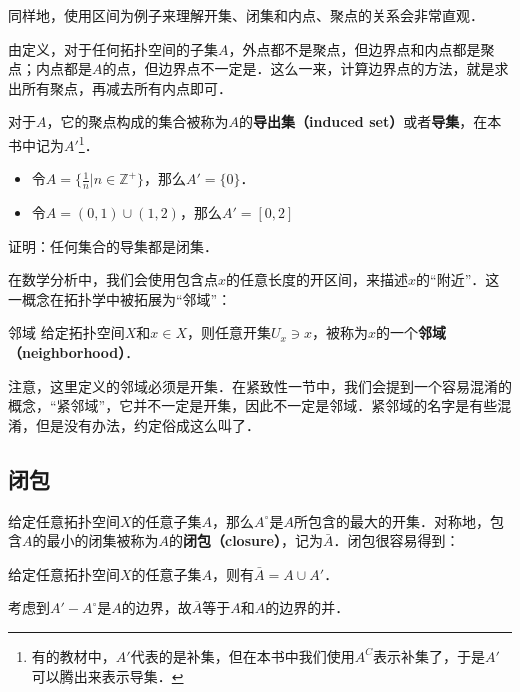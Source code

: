 同样地，使用区间为例子来理解开集、闭集和内点、聚点的关系会非常直观．

由定义，对于任何拓扑空间的子集$A$，外点都不是聚点，但边界点和内点都是聚点；内点都是$A$的点，但边界点不一定是．这么一来，计算边界点的方法，就是求出所有聚点，再减去所有内点即可．

对于$A$，它的聚点构成的集合被称为$A$的\textbf{导出集（induced set）}或者\textbf{导集}，在本书中记为$A'$\footnote{有的教材中，$A'$代表的是补集，但在本书中我们使用$A^C$表示补集了，于是$A'$可以腾出来表示导集．}．

\begin{example}{}
\begin{itemize}
\item 令$A=\{\frac{1}{n}|n\in\mathbb{Z}^+\}$，那么$A'=\{0\}$．
\item 令$A=(0,1)\cup(1,2)$，那么$A'=[0,2]$
\end{itemize}
\end{example}

\begin{exercise}{}
证明：任何集合的导集都是闭集．
\end{exercise}

在数学分析中，我们会使用包含点$x$的任意长度的开区间，来描述$x$的“附近”．这一概念在拓扑学中被拓展为“邻域”：

\begin{definition}{邻域}
给定拓扑空间$X$和$x\in X$，则任意开集$U_x\ni x$，被称为$x$的一个\textbf{邻域（neighborhood）}．
\end{definition}

注意，这里定义的邻域必须是开集．在紧致性一节中，我们会提到一个容易混淆的概念，“紧邻域”，它并不一定是开集，因此不一定是邻域．紧邻域的名字是有些混淆，但是没有办法，约定俗成这么叫了．

\subsection{闭包}

给定任意拓扑空间$X$的任意子集$A$，那么$A^\circ$是$A$所包含的最大的开集．对称地，包含$A$的最小的闭集被称为$A$的\textbf{闭包（closure）}，记为$\bar{A}$．闭包很容易得到：

\begin{theorem}{}
给定任意拓扑空间$X$的任意子集$A$，则有$\bar{A}=A\cup A'$．
\end{theorem}
\begin{corollary}{}\label{Topo0_cor1}
考虑到$A'-A^\circ$是$A$的边界，故$\bar{A}$等于$A$和$A$的边界的并．
\end{corollary}


